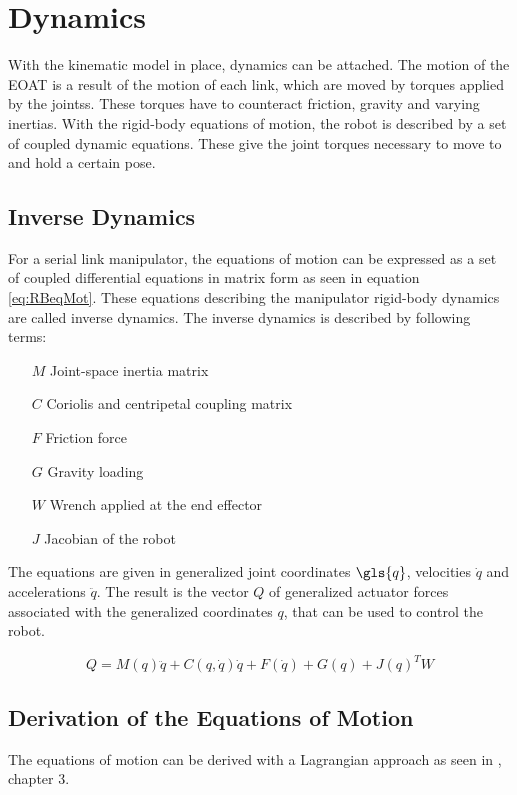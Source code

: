 \section{Dynamics}

With the kinematic model in place, dynamics can be attached. The motion of the \ac{EOAT} is a result of the motion of each link, which are moved by torques applied by the \glspl{joints}. These torques have to counteract friction, gravity and varying inertias.
With the rigid-body equations of motion, the robot is described by a set of coupled dynamic equations. These give the joint torques necessary to move to and hold a certain pose.

\subsection{Inverse Dynamics}

For a serial link manipulator, the equations of motion can be expressed as a set of coupled differential equations in matrix form as seen in equation \ref{eq:RBeqMot}. These equations describing the manipulator rigid-body dynamics are called inverse dynamics.
The inverse dynamics is described by following terms:
\begin{itemize}
	\item[$ M $] Joint-space inertia matrix
	\item[$ C $] Coriolis and centripetal coupling matrix
	\item[$ F $] Friction force
	\item[$ G $] Gravity loading
	\item[$ W $] Wrench applied at the end effector
	\item[$ J $] Jacobian of the robot
\end{itemize}
The equations are given in generalized joint coordinates $\gls{q}$, velocities $\dot{q}$ and accelerations $\ddot{q}$.
The result is the vector $Q$ of generalized actuator forces associated with the generalized coordinates $ q$, that can be used to control the robot.

\begin{equation}\label{eq:RBeqMot}
	Q=M(q)\ddot{q}+C(q,\dot{q})\dot{q}+F(\dot{q})+G(q)+J(q)^TW
\end{equation}


\subsection{Derivation of the Equations of Motion}
The equations of motion can be derived with a Lagrangian approach as seen in \cite{MathIntroRobManip}, chapter 3.

